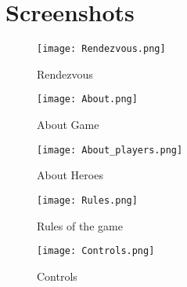 \chapter{Screenshots}

\begin{figure}[htp]
\centering
\texttt{[image: Rendezvous.png]}
\caption{\label{fig:start page}Rendezvous}
\end{figure}

\begin{figure}[htp]
\centering
\texttt{[image: About.png]}
\caption{\label{fig:About}About Game}
\end{figure}

\begin{figure}[htp]
\centering
\texttt{[image: About\_players.png]}
\caption{\label{fig:About_heroes}About Heroes}
\end{figure}

\begin{figure}[htp]
\centering
\texttt{[image: Rules.png]}
\caption{\label{fig:rules}Rules of the game}
\end{figure}

\begin{figure}[htp]
\centering
\texttt{[image: Controls.png]}
\caption{\label{fig:controls}Controls}
\end{figure}


